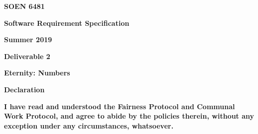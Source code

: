 \documentclass[12pt]{article}
\begin{document}
\begin{Center}
{\fontsize{15pt}{18.0pt}\selectfont \textbf{SOEN 6481}\par}
\end{Center}\par

\begin{Center}
{\fontsize{15pt}{18.0pt}\selectfont \textbf{Software Requirement Specification}\par}
\end{Center}\par

\begin{Center}
{\fontsize{15pt}{18.0pt}\selectfont \textbf{Summer 2019}\par}
\end{Center}\par

\begin{Center}
{\fontsize{15pt}{18.0pt}\selectfont \textbf{Deliverable 2}\par}
\end{Center}\par

\begin{Center}
{\fontsize{15pt}{18.0pt}\selectfont \textbf{Eternity: Numbers}\par}
\end{Center}\par


\vspace{\baselineskip}
\begin{Center}
{\fontsize{15pt}{18.0pt}\selectfont \textbf{Declaration}\par}
\end{Center}\par


\vspace{\baselineskip}
\begin{justify}
{\fontsize{15pt}{18.0pt}\selectfont \textbf{I have read and understood the Fairness Protocol and Communal Work Protocol, and agree to abide by the policies therein, without any exception under any circumstances, whatsoever.}\par}
\end{justify}\par

\tab \tab 
\vspace{\baselineskip}
\vspace{\baselineskip}

\vspace{\baselineskip}
\end{document}
